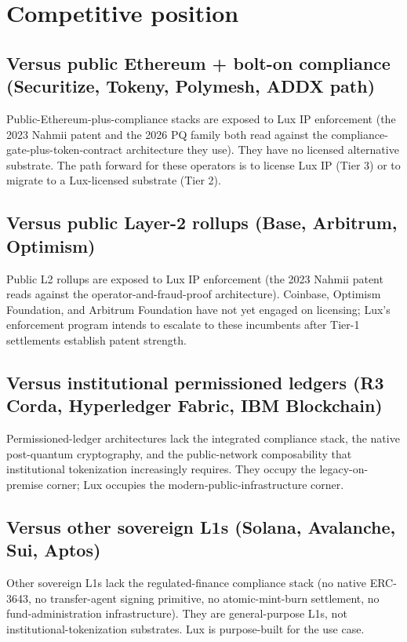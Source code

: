 \documentclass[11pt,letterpaper]{article}
\begin{document}
\section{Competitive position}

\subsection{Versus public Ethereum + bolt-on compliance (Securitize, Tokeny, Polymesh, ADDX path)}

Public-Ethereum-plus-compliance stacks are exposed to Lux IP enforcement (the 2023 Nahmii patent and the 2026 PQ family both read against the compliance-gate-plus-token-contract architecture they use). They have no licensed alternative substrate. The path forward for these operators is to license Lux IP (Tier 3) or to migrate to a Lux-licensed substrate (Tier 2).

\subsection{Versus public Layer-2 rollups (Base, Arbitrum, Optimism)}

Public L2 rollups are exposed to Lux IP enforcement (the 2023 Nahmii patent reads against the operator-and-fraud-proof architecture). Coinbase, Optimism Foundation, and Arbitrum Foundation have not yet engaged on licensing; Lux's enforcement program intends to escalate to these incumbents after Tier-1 settlements establish patent strength.

\subsection{Versus institutional permissioned ledgers (R3 Corda, Hyperledger Fabric, IBM Blockchain)}

Permissioned-ledger architectures lack the integrated compliance stack, the native post-quantum cryptography, and the public-network composability that institutional tokenization increasingly requires. They occupy the legacy-on-premise corner; Lux occupies the modern-public-infrastructure corner.

\subsection{Versus other sovereign L1s (Solana, Avalanche, Sui, Aptos)}

Other sovereign L1s lack the regulated-finance compliance stack (no native ERC-3643, no transfer-agent signing primitive, no atomic-mint-burn settlement, no fund-administration infrastructure). They are general-purpose L1s, not institutional-tokenization substrates. Lux is purpose-built for the use case.
\end{document}
